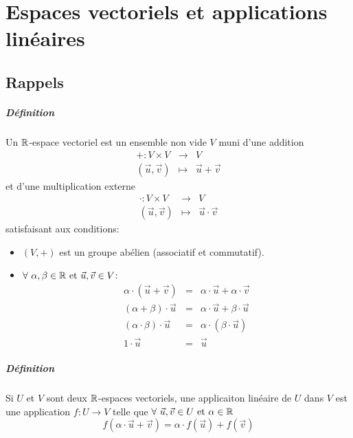 \chapter{Espaces vectoriels et applications linéaires}

%
%
\section{Rappels}
%
%
\paragraph{Définition} Un $\mathbb{R}$-espace vectoriel est un ensemble non vide $V$ muni d'une addition
\begin{eqnarray*}
  +: V \times V &\rightarrow& V \\
  (\vec{u}, \vec{v}) &\mapsto& \vec{u} + \vec{v}
\end{eqnarray*}
et d'une multiplication externe
\begin{eqnarray*}
  \cdot: V \times V &\rightarrow& V \\
  (\vec{u}, \vec{v}) &\mapsto& \vec{u} \cdot \vec{v}
\end{eqnarray*}
satisfaisant aux conditions:
\begin{itemize}
  \item $(V, +)$ est un groupe abélien (associatif et commutatif).
  \item $\forall ~ \alpha, \beta \in \mathbb{R} \text{ et } \vec{u}, \vec{v} \in V$:
    \begin{eqnarray*}
      \alpha \cdot (\vec{u} + \vec{v}) &=& \alpha \cdot \vec{u} + \alpha \cdot \vec{v} \\
      (\alpha + \beta) \cdot \vec{u} &=& \alpha \cdot \vec{u} + \beta \cdot \vec{u} \\
      (\alpha \cdot \beta)\cdot \vec{u} &=& \alpha \cdot (\beta \cdot \vec{u}) \\
      1 \cdot \vec{u} &=& \vec{u}
    \end{eqnarray*}
\end{itemize}

\paragraph{Définition} Si $U$ et $V$ sont deux $\mathbb{R}$-espaces vectoriels, une applicaiton linéaire de $U$ dans $V$ est une application $f: U \rightarrow V$ telle que $\forall ~ \vec{u}, \vec{v} \in U \text{ et } \alpha \in \mathbb{R}$
$$f(\alpha \cdot \vec{u} + \vec{v}) = \alpha \cdot f(\vec{u}) + f(\vec{v})$$

